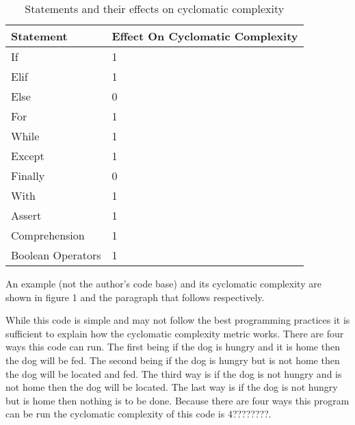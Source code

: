 \documentclass[11pt,journal, a4paper]{IEEEtran}
\begin{document}
\begin{table}[H]
\centering
\caption{Statements and their effects on cyclomatic complexity}
\label{my-label}
\begin{tabular}{|l|l|}
\hline
Statement         & Effect On Cyclomatic Complexity \\ \hline
If                & 1                               \\ \hline
Elif              & 1                               \\ \hline
Else              & 0                               \\ \hline
For               & 1                               \\ \hline
While             & 1                               \\ \hline
Except            & 1                               \\ \hline
Finally           & 0                               \\ \hline
With              & 1                               \\ \hline
Assert            & 1                               \\ \hline
Comprehension     & 1                               \\ \hline
Boolean Operators & 1                               \\ \hline
\end{tabular}
\end{table}

\noindent
An example (not the author's code base) and its cyclomatic complexity are shown in figure 1 and the paragraph that follows respectively. 




\noindent
While this code is simple and may not follow the best programming practices it is sufficient to explain how the cyclomatic complexity metric works. There are four ways this code can run. The first being if the dog is hungry and it is home then the dog will be fed. The second being if the dog is hungry but is not home then the dog will be located and fed. The third way is if the dog is not hungry and is not home then the dog will be located. The last way is if the dog is not hungry but is home then nothing is to be done. Because there are four ways this program can be run the cyclomatic complexity of this code is 4????????.\\  
\end{document}
